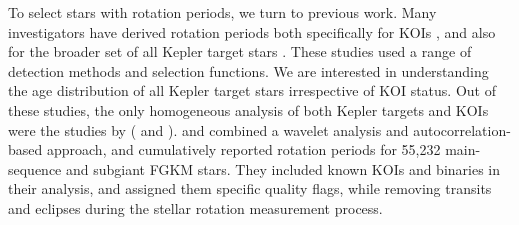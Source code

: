 \documentclass[11pt,twocolumn,tighten]{aastex63}
\begin{document}
To select stars with rotation periods, we turn to previous work.  Many
investigators have derived rotation periods both specifically for KOIs
\citep{McQuillan_2013,Walkowicz_2013,Mazeh_2015,Angus_2018,David_2021},
and also for the broader set of all Kepler target stars
\citep{McQuillan_2014,Reinhold_2015,Santos_2019,Santos_2021}.  These
studies used a range of detection methods and selection functions.  We
are interested in understanding the age distribution of all Kepler
target stars irrespective of KOI status.  Out of these studies, the
only homogeneous analysis of both Kepler targets and KOIs were the
studies by \citet{Santos_2019,Santos_2021} (
and ).   and
 combined a wavelet analysis and
autocorrelation-based approach, and cumulatively reported rotation
periods for 55{,}232 main-sequence and subgiant FGKM stars.  They
included known KOIs and binaries in their analysis, and assigned them
specific quality flags, while removing transits and eclipses during
the stellar rotation measurement process. 

\end{document}
